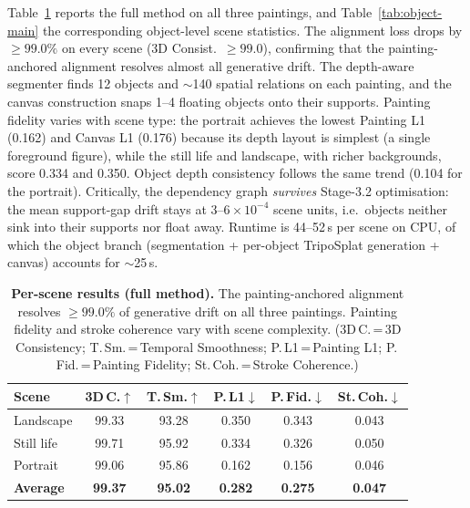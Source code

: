 Table~\ref{tab:main} reports the full method on all three paintings, and
Table~\ref{tab:object-main} the corresponding object-level scene statistics.
The alignment loss drops by $\geq\!99.0\%$ on every scene (3D Consist.\
$\geq 99.0$), confirming that the painting-anchored alignment resolves
almost all generative drift. The depth-aware segmenter finds 12 objects and
$\sim$140 spatial relations on each painting, and the canvas construction
snaps 1--4 floating objects onto their supports. Painting fidelity varies
with scene type: the portrait achieves the lowest Painting L1 (0.162) and
Canvas L1 (0.176) because its depth layout is simplest (a single foreground
figure), while the still life and landscape, with richer backgrounds, score
0.334 and 0.350. Object depth consistency follows the same trend (0.104 for
the portrait). Critically, the dependency graph \emph{survives} Stage-3.2
optimisation: the mean support-gap drift stays at $3$--$6\times10^{-4}$
scene units, i.e.\ objects neither sink into their supports nor float away.
Runtime is 44--52\,s per scene on CPU, of which the object branch
(segmentation + per-object TripoSplat generation + canvas) accounts for
$\sim$25\,s.

\begin{table}[t]
\centering
\scriptsize
\setlength{\tabcolsep}{3pt}
\begin{tabular*}{\linewidth}{@{\extracolsep{\fill}}lccccc}
\toprule
Scene & 3D\,C.$\uparrow$ & T.\,Sm.$\uparrow$ & P.\,L1$\downarrow$ & P.\,Fid.$\downarrow$ & St.\,Coh.$\downarrow$ \\
\midrule
Landscape   & 99.33 & 93.28 & 0.350 & 0.343 & 0.043 \\
Still life  & 99.71 & 95.92 & 0.334 & 0.326 & 0.050 \\
Portrait    & 99.06 & 95.86 & 0.162 & 0.156 & 0.046 \\
\midrule
\textbf{Average} & \textbf{99.37} & \textbf{95.02} & \textbf{0.282} & \textbf{0.275} & \textbf{0.047} \\
\bottomrule
\end{tabular*}
\caption{\textbf{Per-scene results (full method).} The painting-anchored
alignment resolves $\geq 99.0\%$ of generative drift on all three paintings.
Painting fidelity and stroke coherence vary with scene complexity.
(3D\,C.\,=\,3D Consistency; T.\,Sm.\,=\,Temporal Smoothness;
P.\,L1\,=\,Painting L1; P.\,Fid.\,=\,Painting Fidelity;
St.\,Coh.\,=\,Stroke Coherence.)}
\label{tab:main}
\end{table}

